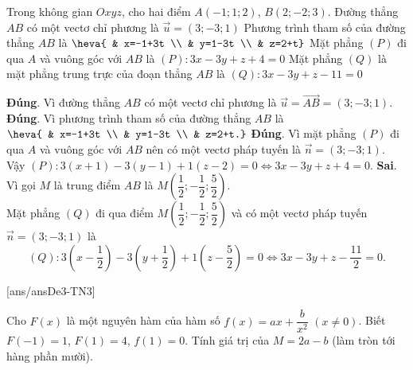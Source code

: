 \begin{ex}%
Trong không gian $Oxyz$, cho hai điểm $A(-1;1;2)$, $B(2;-2;3)$.
\choiceTF
{\True Đường thẳng $AB$ có một vectơ chỉ phương là $\overrightarrow{u}=(3;-3;1)$}
{\True Phương trình tham số của đường thẳng $AB$ là $\heva{ & x=-1+3t \\ & y=1-3t \\ & z=2+t}$}
{\True Mặt phẳng $(P)$ đi qua $A$ và vuông góc với $AB$ là $(P)\colon 3x-3y+z+4=0$}
{Mặt phẳng $(Q)$ là mặt phẳng trung trực của đoạn thẳng $AB$ là $(Q) \colon 3x-3y+z-11=0$}
\loigiai
{
\begin{itemchoice}
\itemch \textbf{Đúng}. Vì đường thẳng $AB$ có một vectơ chỉ phương là $\overrightarrow{u}=\overrightarrow{AB}=(3;-3;1)$.
\itemch \textbf{Đúng}. Vì phương trình tham số của đường thẳng $AB$ là $\heva{ & x=-1+3t \\ & y=1-3t \\ & z=2+t.}$
\itemch \textbf{Đúng}. Vì mặt phẳng $(P)$ đi qua $A$ và vuông góc với $AB$ nên có một vectơ pháp tuyến là $\overrightarrow{n}=(3;-3;1)$. \\
Vậy $(P)\colon 3(x+1)-3(y-1)+1(z-2)=0 \Leftrightarrow 3x-3y+z+4=0$.
\itemch \textbf{Sai}. Vì gọi $M$ là trung điểm $AB$ là $M\left(\dfrac{1}{2};-\dfrac{1}{2};\dfrac{5}{2}\right)$.\\
Mặt phẳng $(Q)$ đi qua điểm $M\left(\dfrac{1}{2};-\dfrac{1}{2};\dfrac{5}{2}\right)$ và có một vectơ pháp tuyến $\overrightarrow{n}=(3;-3;1)$ là
\[(Q)\colon 3\left(x-\dfrac{1}{2}\right)-3\left(y+\dfrac{1}{2}\right)+1\left(z-\dfrac{5}{2}\right)=0 \Leftrightarrow 3x-3y+z-\dfrac{11}{2}=0.\]
\end{itemchoice}
}
\end{ex}

\TNSA
{}[ans/ansDe3-TN3]
\begin{ex}%
Cho $F(x)$ là một nguyên hàm của hàm số $f(x) = ax + \dfrac{b}{x^2}$ $(x \neq 0)$. Biết $F(-1) = 1$, $F(1) = 4$, $f(1) = 0$. Tính giá trị của $M = 2a - b$ (làm tròn tới hàng phần mười).
\end{ex}

